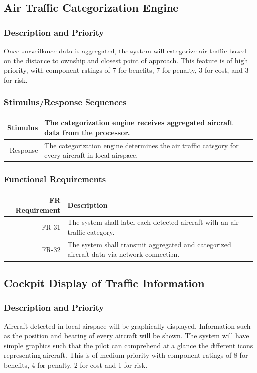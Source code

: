 \documentclass[12pt,oneside,letterpaper]{article}
\begin{document}
\subsection{Air Traffic Categorization Engine}
\subsubsection{Description and Priority}
Once surveillance data is aggregated, the system will categorize air traffic based on the distance to ownship and closest point of approach. This feature is of high priority, with component ratings of 7 for benefits, 7 for penalty, 3 for cost, and 3 for risk.
\subsubsection{Stimulus/Response Sequences}
\begin{longtable}{|r|p{3.8in}|}
\hline
Stimulus & The categorization engine receives aggregated aircraft data from the processor. \\
\hline
Response & The categorization engine determines the air traffic category for every aircraft in local airspace. \\
\hline
\end{longtable}
\subsubsection{Functional Requirements}
\begin{longtable}{|r|p{3.8in}|}
\hline
FR Requirement & Description \\
\hline
FR-31 & The system shall label each detected aircraft with an air traffic category. \\
\hline
FR-32 & The system shall transmit aggregated and categorized aircraft data via network connection. \\
\hline
\end{longtable}

\subsection{Cockpit Display of Traffic Information}
\subsubsection{Description and Priority}
Aircraft detected in local airspace will be graphically displayed. Information such as the position and bearing of every aircraft will be shown. The system will have simple graphics such that the pilot can comprehend at a glance the different icons representing aircraft. This is of medium priority with component ratings of 8 for benefits, 4 for penalty, 2 for cost and 1 for risk.
\end{document}
